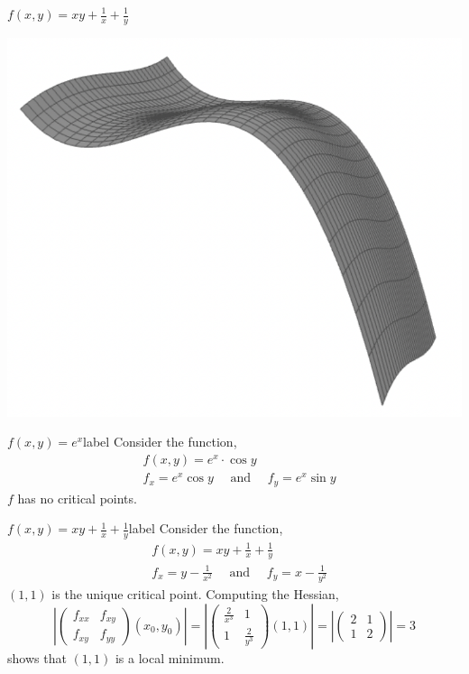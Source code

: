 \begin{marginfigure}
\begin{center}
\end{center}
$f(x,y) =xy+\frac{1}{x}+\frac{1}{y}$
\begin{center}
    \includegraphics[width=0.7\linewidth]{figures/wk-4/fig-47.png}
\end{center}
\end{marginfigure}

\begin{ex}{$f(x, y)=e^x$}{label}
Consider the function,
\begin{align*}
&f(x, y)=e^x \cdot \cos y \\
&f_x=e^x \cos y \quad \text { and } \quad f_y=e^x \sin y
\end{align*}
$f$ has no critical points.
\end{ex}

\begin{ex}{$f(x, y)=x y+\frac{1}{x}+\frac{1}{y}$}{label}
Consider the function,
\begin{align*}
&f(x, y)=x y+\frac{1}{x}+\frac{1}{y} \\
&f_x=y-\frac{1}{x^2} \quad \text{ and } \quad f_y=x-\frac{1}{y^2}
\end{align*}
$(1,1)$ is the unique critical point. Computing the Hessian,
\[
\left|\left(\begin{array}{cc}
f_{x x} & f_{x y} \\
f_{x y} & f_{y y}
\end{array}\right)\left(x_0, y_0\right)\right|=\left|\left(\begin{array}{cc}
\frac{2}{x^3} & 1 \\
1 & \frac{2}{y^3}
\end{array}\right)(1,1)\right|=\left|\left(\begin{array}{cc}
2 & 1 \\
1 & 2
\end{array}\right)\right|=3
\]
shows that $(1,1)$ is a local minimum.
\end{ex}

